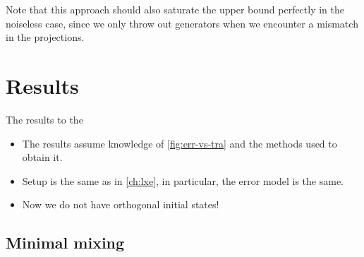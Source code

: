 Note that this approach should also saturate the upper bound perfectly in the
noiseless case, since we only throw out generators when we encounter a mismatch
in the projections.

\section{Results}\label{sec:upperbound-results}

The results to the 
\begin{itemize}
  \item The results assume knowledge of \cref{fig:err-vs-tra} and the methods
    used to obtain it.
  \item Setup is the same as in \cref{ch:lxe}, in particular, the error model
    is the same.
  \item Now we do not have orthogonal initial states!
\end{itemize}
\subsection{Minimal mixing}

